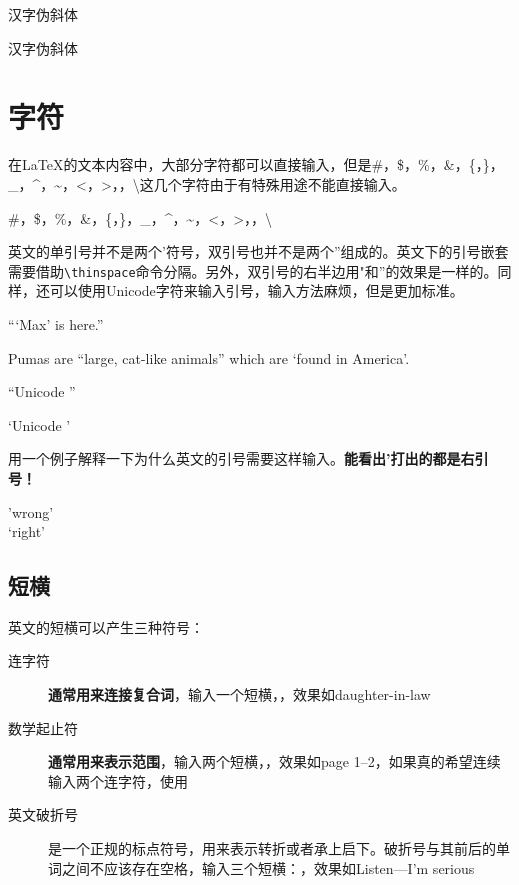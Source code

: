 {\begin{center}
{汉字伪斜体}
\end{center}

\begin{latex}
{汉字伪斜体}
\end{latex}

\section{字符}

在\LaTeX 的文本内容中，大部分字符都可以直接输入，但是\#，\$，\%，\&，\{，\}，\_，\^{}，\~{}，\textless，\textgreater，\textbar，\textbackslash 这几个字符由于有特殊用途不能直接输入。

\begin{codeshow}
\#，\$，\%，\&，\{，\}，\_，\^{}，\~{}，\textless，\textgreater，\textbar，\textbackslash
\end{codeshow}


英文的单引号并不是两个'符号，双引号也并不是两个''组成的。英文下的引号嵌套需要借助\lstinline{\thinspace}命令分隔。另外，双引号的右半边用"和''的效果是一样的。同样，还可以使用Unicode字符来输入引号，输入方法麻烦，但是更加标准。

\begin{codeshow}
``\thinspace`Max' is here.''\par
Pumas are ``large, cat-like animals'' which are `found in America'.\par
\textquotedblleft Unicode \textquotedblright \par
\textquoteleft Unicode \textquoteright
\end{codeshow}

用一个例子解释一下为什么英文的引号需要这样输入。\textbf{能看出'打出的都是右引号！}


\begin{codeshow}
'wrong'\\
`right'
\end{codeshow}

\subsection*{短横}

英文的短横可以产生三种符号：

\begin{description}
    \item[连字符] \textbf{通常用来连接复合词}，输入一个短横，\code{-}，效果如daughter-in-law
    \item[数学起止符] \textbf{通常用来表示范围}，输入两个短横，\code{--}，效果如page 1--2，如果真的希望连续输入两个连字符，使用\code{{-}{-}}
    \item[英文破折号] 是一个正规的标点符号，用来表示转折或者承上启下。破折号与其前后的单词之间不应该存在空格，输入三个短横：\code{---}，效果如Listen---I'm serious
\end{description}

}
